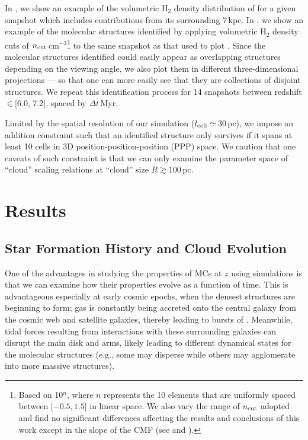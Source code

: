\documentclass[apj]{emulateapj} %
\begin{document}
In , we show an example of the volumetric H$_2$ density distribution of \flower 
for a given snapshot which includes contributions from its surrounding 7\,kpc.
In , we show an example of
the molecular structures identified by applying volumetric H$_2$ density cuts of 
$n_{\rm cut}$\eq[0.32, 0.53, 0.88, 1.45, 2.45, 4.08, 6.81, 11.36, 19.00, 31.62]\,cm$^{-3}$\footnote{
Based on 10$^n$, where $n$ represents the 10 elements that are 
uniformly spaced between [$-0.5, 1.5$] in linear space.
We also vary the range of 
$n_{\rm cut}$ adopted and find no significant differences 
affecting the results and conclusions of this work except in the slope of the CMF (see  and ).}
to the same snapshot as that 
used to plot .
Since the molecular structures identified could 
easily appear as overlapping structures depending on the viewing angle, we 
also plot them in different three-dimensional projections --- so that one can more 
easily see that they are collections of disjoint structures.
We repeat this identification process for 14 snapshots between 
redshift \z$\in$[6.0, 7.2], spaced by $\Delta t$\,Myr. 

Limited by the spatial resolution of our simulation ($l_{\rm cell}\simeq$\,30\,pc), we 
impose an addition constraint such that an identified structure only survives if it
spans at least 10 cells in 3D position-position-position (PPP) space. 
We caution that one caveats of such constraint is that 
we can only examine the parameter space of ``cloud'' scaling
relations at ``cloud'' size $R\gtrsim100$\,pc. 



\section{Results}     \label{sec:results}
\subsection{Star Formation History and Cloud Evolution} \label{sec:sfh}

One of the advantages in studying the properties of MCs at 
$z$ using simulations is that we can examine how their properties evolve 
as a function of time. 
This is advantageous especially at early cosmic epochs, 
when the densest structures are beginning to form; 
gas is constantly being accreted onto the central galaxy from the cosmic web and 
satellite galaxies, thereby leading to bursts of \SF.
Meanwhile, tidal forces resulting from interactions with these surrounding 
galaxies can disrupt the main disk and arms, likely leading to different dynamical states 
for the molecular structures (e.g., some may disperse while others may agglomerate into more massive 
structures). %
\end{document}

